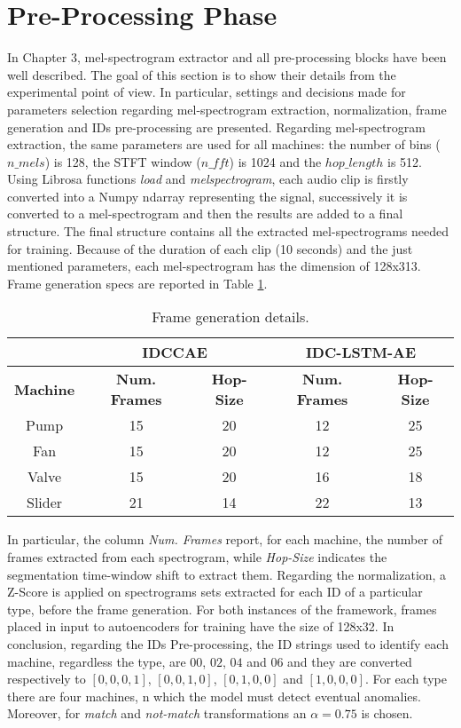 \section{Pre-Processing Phase}
In Chapter 3, mel-spectrogram extractor and all pre-processing blocks have been well described. The goal of this section is to show their details from the experimental point of view. In particular, settings and decisions made for parameters selection regarding mel-spectrogram extraction, normalization, frame generation and IDs pre-processing are presented. Regarding mel-spectrogram extraction, the same parameters are used for all machines: the number of bins ($n\_mels$) is 128, the STFT window ($n\_fft$) is 1024 and the $hop\_length$ is 512. Using Librosa functions \textit{load} and \textit{melspectrogram}, each audio clip is firstly converted into a Numpy ndarray representing the signal, successively it is converted to a mel-spectrogram and then the results are added to a final structure. The final structure contains all the extracted mel-spectrograms needed for training. Because of the duration of each clip (10 seconds) and the just mentioned parameters, each mel-spectrogram has the dimension of 128x313. Frame generation specs are reported in Table \ref{frame-generation}.\\
\begin{table}[ht]
\centering
\begin{tabular}{|c|c|c|c|c|} 
\cline{2-5}
\multicolumn{1}{c|}{} & \multicolumn{2}{c|}{\textbf{IDCCAE}} & \multicolumn{2}{c|}{\textbf{IDC-LSTM-AE}} \\ 
\hline
\textbf{Machine} & \textbf{Num. Frames} & \textbf{Hop-Size} & \textbf{Num. Frames} & \textbf{Hop-Size} \\ 
\hline
Pump & 15 & 20 & 12 & 25  \\ 
\hline
Fan & 15 & 20 & 12 & 25  \\ 
\hline
Valve & 15 & 20 & 16 & 18  \\ 
\hline
Slider & 21 & 14 & 22 & 13  \\
\hline
\end{tabular}
\caption{Frame generation details.}
\label{frame-generation}
\end{table}

In particular, the column \textit{Num. Frames} report, for each machine, the number of frames extracted from each spectrogram, while \textit{Hop-Size} indicates the segmentation time-window shift to extract them. Regarding the normalization, a Z-Score is applied on spectrograms sets extracted for each ID of a particular type, before the frame generation. For both instances of the framework, frames placed in input to autoencoders for training have the size of 128x32. In conclusion, regarding the IDs Pre-processing, the ID strings used to identify each machine, regardless the type, are $00$, $02$, $04$ and $06$ and they are converted respectively to $[0,0,0,1]$, $[0,0,1,0]$, $[0,1,0,0]$ and $[1,0,0,0]$. For each type there are four machines, n which the model must detect eventual anomalies. Moreover, for \textit{match} and \textit{not-match} transformations an $\alpha=0.75$ is chosen.

